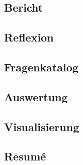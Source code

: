 \documentclass[12pt]{article}
\begin{document}
    \subsection{Bericht}
    
    \subsection{Reflexion}
    
    \subsection{Fragenkatalog}
    
    \subsection{Auswertung}
    
    \subsection{Visualisierung}
    
    \subsection{Resumé}
    
\end{document}
